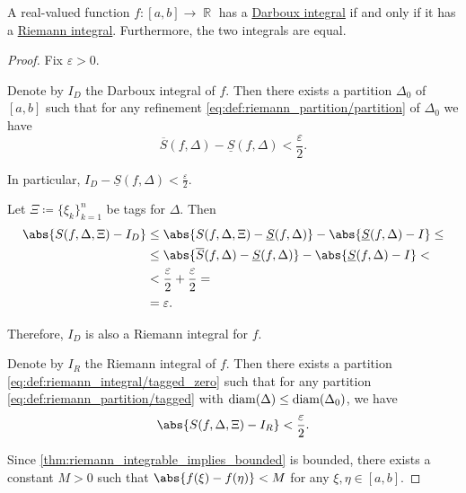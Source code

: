 \begin{proposition}\label{thm:darboux_integral_iff_riemann_integral}
  A real-valued function \( f: [a, b] \to \BbbR \) has a \hyperref[def:darboux_integral]{Darboux integral} if and only if it has a \hyperref[def:riemann_integral]{Riemann integral}. Furthermore, the two integrals are equal.
\end{proposition}
\begin{proof}
  Fix \( \varepsilon > 0 \).

   Denote by \( I_D \) the Darboux integral of \( f \). Then there exists a partition \( \Delta_0 \) of \( [a, b] \) such that for any refinement \eqref{eq:def:riemann_partition/partition} of \( \Delta_0 \) we have
  \begin{equation*}
    \overline{S}(f, \Delta) - \underline{S}(f, \Delta) < \frac \varepsilon 2.
  \end{equation*}

  In particular, \( I_D - \underline{S}(f, \Delta) < \tfrac \varepsilon 2 \).

  Let \( \Xi \coloneqq \{ \xi_k \}_{k=1}^n \) be tags for \( \Delta \). Then
  \begin{align*}
    \abs{S(f, \Delta, \Xi) - I_D}
    &\leq
    \abs{S(f, \Delta, \Xi) - \underline{S}(f, \Delta)} - \abs{\underline{S}(f, \Delta) - I}
    \leq \\ &\leq
    \abs{\overline{S}(f, \Delta) - \underline{S}(f, \Delta)} - \abs{\underline{S}(f, \Delta) - I}
    < \\ &<
    \frac \varepsilon 2 + \frac \varepsilon 2
    = \\ &=
    \varepsilon.
  \end{align*}

  Therefore, \( I_D \) is also a Riemann integral for \( f \).

   Denote by \( I_R \) the Riemann integral of \( f \). Then there exists a partition \eqref{eq:def:riemann_integral/tagged_zero} such that for any partition \eqref{eq:def:riemann_partition/tagged} with \( \operatorname{diam}(\Delta) \leq \operatorname{diam}(\Delta_0) \), we have
  \begin{equation*}
    \abs{S(f, \Delta, \Xi) - I_R} < \frac \varepsilon 2.
  \end{equation*}

  Since \eqref{thm:riemann_integrable_implies_bounded} is bounded, there exists a constant \( M > 0 \) such that \( \abs{f(\xi) - f(\eta)} < M \) for any \( \xi, \eta \in [a, b] \).


\end{proof}
